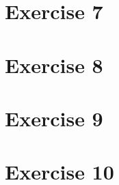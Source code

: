 \documentclass[12pt]{article}
\newcommand{\desc}[1]{\textit{#1} \vspace{1em}}
\begin{document}
\clearpage
\section*{Exercise 7}
\desc{}

\clearpage
\section*{Exercise 8}
\desc{}

\clearpage
\section*{Exercise 9}
\desc{}

\clearpage
\section*{Exercise 10}
\desc{}

\clearpage
\end{document}
